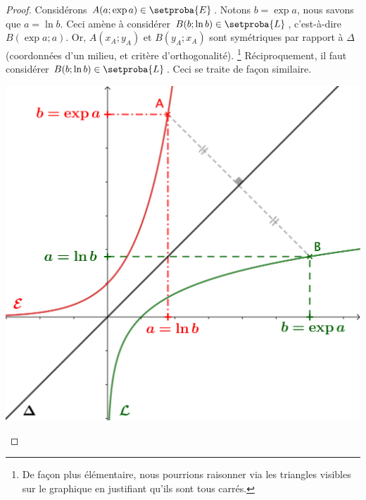 \begin{proof}
	Considérons $A(a;\exp a) \in \setproba{E}$.
	Notons $b = \exp a$, nous savons que $a = \ln b$.
	Ceci amène à considérer $B(b;\ln b) \in \setproba{L}$,
	c'est-à-dire $B(\exp a;a)$.
	Or,
	$A(x_A;y_A)$ et $B(y_A;x_A)$ sont symétriques par rapport à $\Delta$ (coordonnées d'un milieu, et critère d'orthogonalité).%
	\footnote{
		De façon plus élémentaire, nous pourrions raisonner via les triangles visibles sur le graphique en justifiant qu'ils sont tous carrés.
	}
	Réciproquement, il faut considérer $B(b;\ln b) \in \setproba{L}$.
	Ceci se traite de façon similaire.


	\begin{center}
		\includegraphics[scale=.85]{content/exp/graph.png}
	\end{center}
\end{proof}
